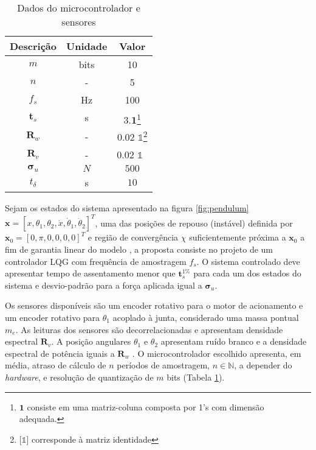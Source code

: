 \documentclass[a4paper, twoside]{article}
\begin{document}
\begin{table}[!ht]
\begin{minipage}[b]{0.45\linewidth}
\begin{tabular}{|c|c|c|}
                    \hline Descrição & Unidade & Valor\\ \hline
                    $m$ & bits & 10 \\
                    $n$ & - & 5 \\
                    $f_s$ & Hz & 100 \\
                    $\mathbf{t}_s$ & s & $3.\mathbf{1}$\footnote{$\mathbf{1} $ consiste em uma matriz-coluna composta por 1's com dimensão adequada.} \\
                    $\mathbf{R}_w$ & - & 0.02 $\mathds{1}$\footnote{[$\mathds{1}$] corresponde à matriz identidade}  \\ 
                    $\mathbf{R}_v$ & - & 0.02 $\mathds{1}$ \, \\
                    $\mathbf{\sigma}_u$ & $N$ & $500$ \\
                    $t_{\delta}$ & s & $10$ \\
                    \hline
                \end{tabular}
                \caption{Dados do microcontrolador e sensores}
                \label{tab:dados_controle}
        \end{minipage}
    \end{table}
    
    Sejam os estados do sistema apresentado na figura \ref{fig:pendulum} $\mathbf{x} = [x, \theta_1, \theta_2, \dot x, \dot \theta_1, \dot \theta_2]^T$, uma das posições de repouso (instável) definida por $\mathbf{x}_{0} = [0, \pi, 0, 0, 0, 0]^T$ e região de convergência $\chi$ suficientemente próxima a $\mathbf{x}_{0}$ a fim de garantia linear do modelo \cite{Adamy2009}, a proposta consiste no projeto de um controlador LQG com frequência de amostragem $f_s$. O sistema controlado deve apresentar tempo de assentamento menor que $\mathbf{t}_s^{1\%}$ para cada um dos estados do sistema e desvio-padrão para a força aplicada igual a $\mathbf{\sigma}_u$. 
    
    Os sensores disponíveis são um encoder rotativo para o motor de acionamento e um encoder rotativo para $\theta_1$ acoplado à junta, considerado uma massa pontual $m_e$. As leituras dos sensores são decorrelacionadas e apresentam densidade espectral $\mathbf{R}_v$. A posição angulares $\theta_1$ e $\theta_2$ apresentam ruído branco e a densidade espectral de potência iguais a $\mathbf{R}_w$ \cite{controle_digital_2018}. O microcontrolador escolhido apresenta, em média, atraso de cálculo de $n$ períodos de amostragem, $n \in \mathbb{N}$, a depender do \emph{hardware}, e resolução de quantização de $m$ bits (Tabela \ref{tab:dados_controle}).
    
\end{document}
